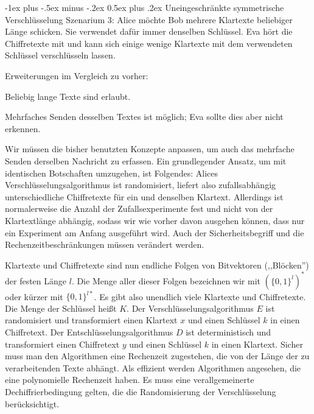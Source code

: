 \documentclass[a4paper]{article}
\makeatletter
\renewcommand{\section}{\@startsection{section}{1}{0mm}%
 {-1ex plus -.5ex minus -.2ex}%
 {0.5ex plus .2ex}%
 {\normalfont\large\bfseries}}
\makeatother
\begin{document}
\begin{multicols}{3}
    \section{Uneingeschränkte symmetrische Verschlüsselung}
    Szenarium 3: Alice möchte Bob mehrere Klartexte beliebiger Länge schicken. Sie verwendet dafür immer denselben Schlüssel. Eva hört die Chiffretexte mit und kann sich einige wenige Klartexte mit dem verwendeten Schlüssel verschlüsseln lassen.

    Erweiterungen im Vergleich zu vorher:
    \begin{enumerate*}
        \item Beliebig lange Texte sind erlaubt.
        \item  Mehrfaches Senden desselben Textes ist möglich; Eva sollte dies aber nicht erkennen.
    \end{enumerate*}

    Wir müssen die bisher benutzten Konzepte anpassen, um auch das mehrfache Senden derselben Nachricht zu erfassen. Ein grundlegender Ansatz, um mit identischen Botschaften umzugehen, ist Folgendes: Alices Verschlüsselungsalgorithmus ist randomisiert, liefert also zufallsabhängig unterschiedliche Chiffretexte für ein und denselben Klartext. Allerdings ist normalerweise die Anzahl der Zufallsexperimente fest und nicht von der Klartextlänge abhängig, sodass wir wie vorher davon ausgehen können, dass nur ein Experiment am Anfang ausgeführt wird. Auch der Sicherheitsbegriff und die Rechenzeitbeschränkungen müssen verändert werden.

    Klartexte und Chiffretexte sind nun endliche Folgen von Bitvektoren (,,Blöcken'') der festen Länge $l$. Die Menge aller dieser Folgen bezeichnen wir mit $(\{0,1\}^l)^*$ oder kürzer mit $\{0,1\}^{l*}$. Es gibt also unendlich viele Klartexte und Chiffretexte. Die Menge der Schlüssel heißt $K$. Der Verschlüsselungsalgorithmus $E$ ist randomisiert und transformiert einen Klartext $x$ und einen Schlüssel $k$ in einen Chiffretext. Der Entschlüsselungsalgorithmus $D$ ist deterministisch und transformiert einen Chiffretext $y$ und einen Schlüssel $k$ in einen Klartext. Sicher muss man den Algorithmen eine Rechenzeit zugestehen, die von der Länge der zu verarbeitenden Texte abhängt. Als effizient werden Algorithmen angesehen, die eine polynomielle Rechenzeit haben. Es muss eine verallgemeinerte Dechiffrierbedingung gelten, die die Randomisierung der Verschlüsselung berücksichtigt.


\end{multicols}
\end{document}
